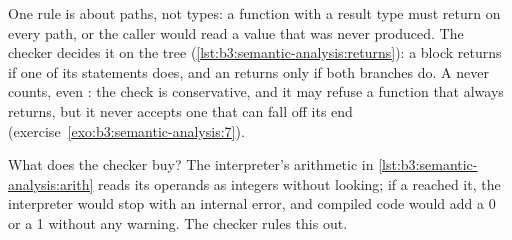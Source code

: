 \begin{omfigure}
\par{}
\end{omfigure}

\label{lst:b3:semantic-analysis:binary}

One rule is about paths, not types: a function with a result type must return on every path, or the caller would read a value that was never produced. The checker decides it on the tree (\cref{lst:b3:semantic-analysis:returns}): a block returns if one of its statements does, and an  returns only if both branches do. A  never counts, even : the check is conservative, and it may refuse a function that always returns, but it never accepts one that can fall off its end (exercise~\ref{exo:b3:semantic-analysis:7}).

\label{lst:b3:semantic-analysis:returns}

What does the checker buy? The interpreter's arithmetic in \cref{lst:b3:semantic-analysis:arith} reads its operands as integers without looking; if a  reached it, the interpreter would stop with an internal error, and compiled code would add a 0 or a 1 without any warning. The checker rules this out.


